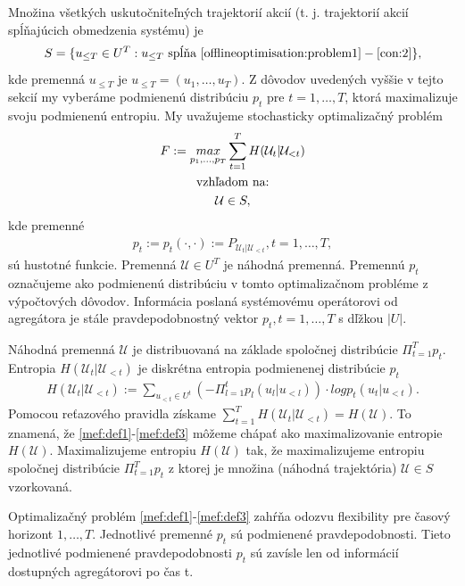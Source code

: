 \noindent
Množina všetkých uskutočniteľných  trajektorií akcií (t. j. trajektorií akcií spĺňajúcich obmedzenia systému) je
\begin{equation}
    S = \{u_{\leq T} \in U^{T}: u_{\leq T} \text{ spĺňa } \eqref{offlineoptimisation:problem1} - \eqref{con:2} \},
\end{equation}
kde premenná $u_{\leq T}$ je $u_{\leq T} = (u_{1}, \dots, u_{T})$.
\noindent
Z dôvodov uvedených vyššie v tejto sekcií my vyberáme podmienenú distribúciu $p_{t}$ pre $t = 1, \dots, T$, ktorá maximalizuje svoju podmienenú entropiu. My uvažujeme stochasticky optimalizačný problém
\begin{gather}
    \label{mef:def1}
    F := \underset{p_{1},\dots, p_{T}}{max} \sum_{t=1}^{T} H(\mathcal{U}_{t}|\mathcal{U}_{<t}) \\
    \notag
    \text{vzhľadom na:} \\
    \mathcal{U} \in S,
\end{gather}
kde premenné
\begin{gather}
    \label{mef:def2}
p_{t} := p_{t}(\cdot, \cdot) := P_{\mathcal{U}_{t}|\mathcal{U}_{<t}}, t = 1,\dots,T,
\end{gather}
sú hustotné funkcie. Premenná $\mathcal{U} \in U^{T}$ je náhodná premenná. Premennú $p_{t}$ označujeme ako podmienenú distribúciu v tomto optimalizačnom probléme z výpočtových dôvodov. Informácia poslaná systémovému operátorovi od agregátora je stále pravdepodobnostný vektor $p_{t}, t=1,\dots,T$ s dľžkou $|U|$.  

Náhodná premenná $\mathcal{U}$ je distribuovaná na základe spoločnej distribúcie $\Pi_{t =1}^{T} p_{t}$. Entropia $H(\mathcal{U}_{t}|\mathcal{U}_{<t})$ je diskrétna entropia podmienenej distribúcie $p_{t}$ 
\begin{gather}
    \label{mef:def3}
    H(\mathcal{U}_{t}|\mathcal{U}_{<t}) := \sum_{u_{<t} \in U^{t}} (- \Pi_{l=1}^{t}p_{l}(u_{l}|u_{<l})) \cdot log p_{t}(u_{t} | u_{<t}).
\end{gather}
Pomocou reťazového pravidla získame $\sum_{t=1}^{T} H(\mathcal{U}_{t}|\mathcal{U}_{<t})=H(\mathcal{U})$. To znamená, že \eqref{mef:def1}-\eqref{mef:def3} môžeme chápať ako maximalizovanie entropie $H(\mathcal{U})$. Maximalizujeme entropiu $H(\mathcal{U})$ tak, že maximalizujeme entropiu spoločnej distribúcie $\Pi_{t =1}^{T} p_{t}$ z ktorej je množina (náhodná trajektória) $\mathcal{U} \in S$ vzorkovaná.   

Optimalizačný problém \eqref{mef:def1}-\eqref{mef:def3} zahŕňa odozvu flexibility pre časový horizont $1, \dots, T$. Jednotlivé premenné $p_{t}$ sú podmienené pravdepodobnosti. Tieto jednotlivé podmienené pravdepodobnosti $p_{t}$ sú zavísle len od informácií dostupných agregátorovi po čas t. 



